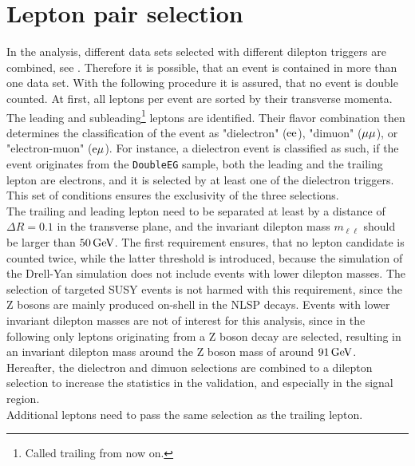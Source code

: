 \section{Lepton pair selection}\label{sec:lepPair}
In the analysis, different data sets selected with different dilepton triggers are combined, see . Therefore it is possible, that an event is contained in more than one data set. With the following procedure it is assured, that no event is double counted. At first, all leptons per event are sorted by their transverse momenta. The leading and subleading\footnote{Called trailing from now on.} leptons are identified. Their flavor combination then determines the classification of the event as "dielectron" ($\mathrm{e}\mathrm{e}$), "dimuon" (${\mu}{\mu}$), or "electron-muon" ($\mathrm{e}{\mu}$). For instance, a dielectron event is classified as such, if  the event originates from the \texttt{DoubleEG} sample, both the leading and the trailing lepton are electrons, and it is selected by at least one of the dielectron triggers. This set of conditions ensures the exclusivity of the three selections.\\
The trailing and leading lepton need to be separated at least by a distance of $\Delta R=0.1$ in the transverse plane, and the invariant dilepton mass $m_{\ell\ell}$ should be larger than $50\,\text{Ge\hspace{-.08em}V}$. The first requirement ensures, that no lepton candidate is counted twice, while the latter threshold is introduced, because the simulation of the Drell-Yan simulation does not include events with lower dilepton masses. The selection of targeted SUSY events is not harmed with this requirement, since the Z bosons are mainly produced on-shell in the NLSP decays. Events with lower invariant dilepton masses are not of interest for this analysis, since in the following only leptons originating from a Z boson decay are selected, resulting in an invariant dilepton mass around the Z boson mass of around $91\,\text{Ge\hspace{-.08em}V}$.\\
Hereafter, the dielectron and dimuon selections are combined to a dilepton selection to increase the statistics in the validation, and especially in the signal region.\\
Additional leptons need to pass the same selection as the trailing lepton.



